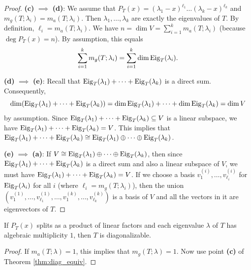 \begin{proof}
  \textbf{(c)} $\implies$ \textbf{(d)}: We assume that $P_T(x) = (\lambda_1 - x)^{\ell_1} \dots (\lambda_k - x)^{\ell_k}$ and $m_g(T; \lambda_i) = m_a(T; \lambda_i)$.
  Then $\lambda_1, \dots, \lambda_k$ are exactly the eigenvalues of $T$. By definition, $\ell_i = m_a(T; \lambda_i)$.
  We have $n = \dim V = \sum_{i=1}^k m_a(T; \lambda_i)$ (because $\deg P_T(x) = n$).
  By assumption, this equals \[ \sum_{i=1}^k m_g(T; \lambda_i) = \sum_{i=1}^k \dim \operatorname{Eig}_T(\lambda_i). \]

  \textbf{(d)} $\implies$ \textbf{(e)}: Recall that $\operatorname{Eig}_T(\lambda_1) + \dots + \operatorname{Eig}_T(\lambda_k)$ is a direct sum.
  Consequently, \[ \dim(\operatorname{Eig}_T(\lambda_1) + \dots + \operatorname{Eig}_T(\lambda_k)) = \dim \operatorname{Eig}_T(\lambda_1) + \dots + \dim \operatorname{Eig}_T(\lambda_k) = \dim V \] by assumption.
  Since $\operatorname{Eig}_T(\lambda_1) + \dots + \operatorname{Eig}_T(\lambda_k) \subseteq V$ is a linear subspace, we have $\operatorname{Eig}_T(\lambda_1) + \dots + \operatorname{Eig}_T(\lambda_k) = V$.
  This implies that $\operatorname{Eig}_T(\lambda_1) + \dots + \operatorname{Eig}_T(\lambda_k) \cong \operatorname{Eig}_T(\lambda_1) \oplus \dots \oplus \operatorname{Eig}_T(\lambda_k)$.

  \textbf{(e)} $\implies$ \textbf{(a)}: If $V \cong \operatorname{Eig}_T(\lambda_1) \oplus \dots \oplus \operatorname{Eig}_T(\lambda_k)$, then since $\operatorname{Eig}_T(\lambda_1) + \dots + \operatorname{Eig}_T(\lambda_k)$ is a direct sum and also a linear subspace of $V$, we must have $\operatorname{Eig}_T(\lambda_1) + \dots + \operatorname{Eig}_T(\lambda_k) = V$.
  If we choose a basis $v_1^{(i)}, \dots, v_{\ell_i}^{(i)}$ for $\operatorname{Eig}_T(\lambda_i)$ for all $i$ (where $\ell_i = m_g(T; \lambda_i)$), then the union $(v_1^{(1)}, \dots, v_{\ell_1}^{(1)}, \dots, v_1^{(k)}, \dots, v_{\ell_k}^{(k)})$ is a basis of $V$ and all the vectors in it are eigenvectors of $T$.
\end{proof}

\begin{corollary}\label{cor:sufficient_diag}
  If $P_T(x)$ splits as a product of linear factors and each eigenvalue $\lambda$ of $T$ has algebraic multiplicity $1$, then $T$ is diagonalizable.
\end{corollary}

\begin{proof}
  If $m_a(T; \lambda) = 1$, this implies that $m_g(T; \lambda) = 1$. Now use point \textbf{(c)} of Theorem \ref{thm:diag_equiv}.
\end{proof}



